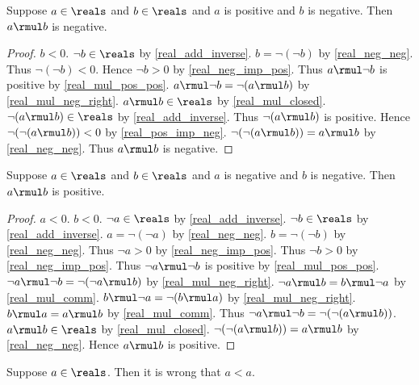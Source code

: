 \begin{lemma}\label{real_mul_pos_neg}
    Suppose $a\in\reals$ and $b\in\reals$ and $a$ is positive and $b$ is negative.
    Then $a \rmul b$ is negative.
\end{lemma}
\begin{proof}
    $b < 0$.
    $\neg{b}\in\reals$ by \cref{real_add_inverse}.
    $b = \neg{(\neg{b})}$ by \cref{real_neg_neg}.
    Thus $\neg{(\neg{b})} < 0$.
    Hence $\neg{b} > 0$ by \cref{real_neg_imp_pos}.
    Thus $a \rmul \neg{b}$ is positive by \cref{real_mul_pos_pos}.
    $a \rmul \neg{b} = \neg{(a \rmul b)}$ by \cref{real_mul_neg_right}.
    $a \rmul b\in\reals$ by \cref{real_mul_closed}.
    $\neg{(a \rmul b)}\in\reals$ by \cref{real_add_inverse}.
    Thus $\neg{(a \rmul b)}$ is positive.
    Hence $\neg{(\neg{(a \rmul b)})} < 0$ by \cref{real_pos_imp_neg}.
    $\neg{(\neg{(a \rmul b)})} = a \rmul b$ by \cref{real_neg_neg}.
    Thus $a \rmul b$ is negative.
\end{proof}

\begin{lemma}\label{real_mul_neg_neg}
    Suppose $a\in\reals$ and $b\in\reals$ and $a$ is negative and $b$ is negative.
    Then $a \rmul b$ is positive.
\end{lemma}
\begin{proof}
    $a < 0$.
    $b < 0$.
    $\neg{a}\in\reals$ by \cref{real_add_inverse}.
    $\neg{b}\in\reals$ by \cref{real_add_inverse}.
    $a = \neg{(\neg{a})}$ by \cref{real_neg_neg}.
    $b = \neg{(\neg{b})}$ by \cref{real_neg_neg}.
    Thus $\neg{a} > 0$ by \cref{real_neg_imp_pos}.
    Thus $\neg{b} > 0$ by \cref{real_neg_imp_pos}.
    Thus $\neg{a} \rmul \neg{b}$ is positive by \cref{real_mul_pos_pos}.
    $\neg{a} \rmul \neg{b} = \neg{(\neg{a} \rmul b)}$ by \cref{real_mul_neg_right}.
    $\neg{a} \rmul b = b \rmul \neg{a}$ by \cref{real_mul_comm}.
    $b \rmul \neg{a} = \neg{(b \rmul a)}$ by \cref{real_mul_neg_right}.
    $b \rmul a = a \rmul b$ by \cref{real_mul_comm}.
    Thus $\neg{a} \rmul \neg{b} = \neg{(\neg{(a \rmul b)})}$.
    $a \rmul b\in\reals$ by \cref{real_mul_closed}.
    $\neg{(\neg{(a \rmul b)})} = a \rmul b$ by \cref{real_neg_neg}.
    Hence $a \rmul b$ is positive.
\end{proof}

\begin{axiom}\label{real_lt_irreflexive}
    Suppose $a\in\reals$.
    Then it is wrong that $a < a$.
\end{axiom}

